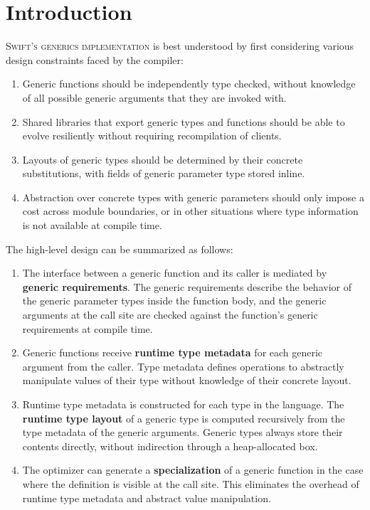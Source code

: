 \documentclass[../generics]{subfiles}
\begin{document}
\chapter{Introduction}\label{roadmap}

\lettrine{S}{wift's generics implementation} is best understood by first considering various design constraints faced by the compiler:
\begin{enumerate}
\item Generic functions should be independently type checked, without knowledge of all possible generic arguments that they are invoked with.
\item Shared libraries that export generic types and functions should be able to evolve resiliently without requiring recompilation of clients.
\item Layouts of generic types should be determined by their concrete substitutions, with fields of generic parameter type stored inline.
\item Abstraction over concrete types with generic parameters should only impose a cost across module boundaries, or in other situations where type information is not available at compile time.
\end{enumerate}

\noindent The high-level design can be summarized as follows:
\begin{enumerate}
\item The interface between a generic function and its caller is mediated by \textbf{generic requirements}. The generic requirements describe the behavior of the generic parameter types inside the function body, and the generic arguments at the call site are checked against the function's generic requirements at compile time.
\item Generic functions receive \textbf{runtime type metadata} for each generic argument from the caller. Type metadata defines operations to abstractly manipulate values of their type without knowledge of their concrete layout.
\item Runtime type metadata is constructed for each type in the language. The \textbf{runtime type layout} of a generic type is computed recursively from the type metadata of the generic arguments. Generic types always store their contents directly, without indirection through a heap-allocated box.
\item The optimizer can generate a \textbf{specialization} of a generic function in the case where the definition is visible at the call site. This eliminates the overhead of runtime type metadata and abstract value manipulation.
\end{enumerate}
\end{document}
